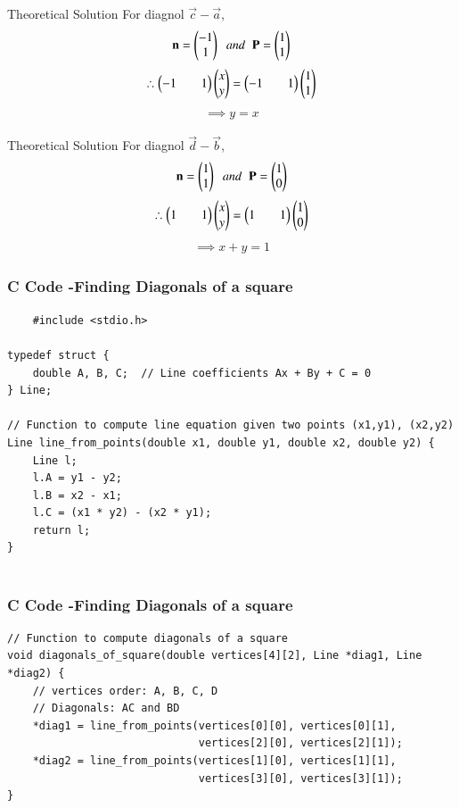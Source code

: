 \documentclass{beamer}
\begin{document}
\begin{frame}{Theoretical Solution}
For diagnol $\vec{c}-\vec{a}$,
\begin{align*}
    \mathbf{n}=\begin{pmatrix}-1\\1\end{pmatrix}\;\;and\;\;\mathbf{P}=\begin{pmatrix}1\\1\end{pmatrix}
\end{align*}
\begin{align*}
    \therefore \begin{pmatrix}-1&&1\end{pmatrix}\begin{pmatrix}x\\y\end{pmatrix}=\begin{pmatrix}-1&&1\end{pmatrix}\begin{pmatrix}1\\1\end{pmatrix}
\end{align*}
\begin{align*}
    \implies y=x
\end{align*}
\end{frame}

\begin{frame}{Theoretical Solution}
For diagnol $\vec{d}-\vec{b}$,
\begin{align*}
    \mathbf{n}=\begin{pmatrix}1\\1\end{pmatrix}\;\;and\;\;\mathbf{P}=\begin{pmatrix}1\\0\end{pmatrix}
\end{align*}
\begin{align*}
    \therefore \begin{pmatrix}1&&1\end{pmatrix}\begin{pmatrix}x\\y\end{pmatrix}=\begin{pmatrix}1&&1\end{pmatrix}\begin{pmatrix}1\\0\end{pmatrix}
\end{align*}
\begin{align*}
    \implies x+y=1
\end{align*}
\end{frame}

\begin{frame}[fragile]
    \frametitle{C Code -Finding Diagonals of a square}

    \begin{lstlisting}
    #include <stdio.h>

typedef struct {
    double A, B, C;  // Line coefficients Ax + By + C = 0
} Line;

// Function to compute line equation given two points (x1,y1), (x2,y2)
Line line_from_points(double x1, double y1, double x2, double y2) {
    Line l;
    l.A = y1 - y2;
    l.B = x2 - x1;
    l.C = (x1 * y2) - (x2 * y1);
    return l;
}


    \end{lstlisting}
\end{frame}

\begin{frame}[fragile]
    \frametitle{C Code -Finding Diagonals of a square}

    \begin{lstlisting}
// Function to compute diagonals of a square
void diagonals_of_square(double vertices[4][2], Line *diag1, Line *diag2) {
    // vertices order: A, B, C, D
    // Diagonals: AC and BD
    *diag1 = line_from_points(vertices[0][0], vertices[0][1],
                              vertices[2][0], vertices[2][1]);
    *diag2 = line_from_points(vertices[1][0], vertices[1][1],
                              vertices[3][0], vertices[3][1]);
}


    \end{lstlisting}
\end{frame}
\end{document}
